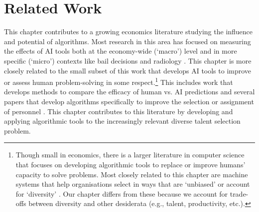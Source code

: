 \section{Related Work}\label{sec:spfrelwork}
This chapter contributes to a growing economics literature studying the influence and potential of algorithms. Most research in this area has focused on measuring the effects of AI tools both at the economy-wide (`macro') level \cite{acemoglu2022automation,babina2024artificial,calvino2023portrait,zolas2021advanced,webb2019impact} and in more specific (`micro') contexts like bail decisions and radiology \cite{albright2023hidden,kleinberg2015prediction,stevenson2019algorithmic,angelova2023algorithmic,imai2023experimental,grimon2022impact,noy2023experimental,brynjolfsson2023generative,bundorf2019humans, mullainathan2019machine, ribers2020machine, agarwal2023combining}. This chapter is more closely related to the small subset of this work that develops AI tools to improve or assess human problem-solving in some respect.\footnote{Though small in economics, there is a larger literature in computer science that focuses on developing algorithmic tools to replace or improve humans' capacity to solve problems. Most closely related to this chapter are machine systems that help organisations select in ways that are `unbiased' \cite{tambe2019artificial,raghavan2020mitigating} or account for `diversity' \cite{gillet_diversity_2011,huppenkothen2020entrofy}. Our chapter differs from these because we account for trade-offs between diversity and other desiderata (e.g., talent, productivity, etc.).}  This includes work that develops methods to compare the efficacy of human vs. AI predictions \cite{kleinberg2018human,rambachan2024identifying} and several papers that develop algorithms specifically to improve the selection or assignment of personnel \cite{li2020hiring,bergman2021seven,kleinberg2018algorithmic,huppenkothen2020entrofy}. This chapter contributes to this literature by developing and applying algorithmic tools to the increasingly relevant diverse talent selection problem. 

